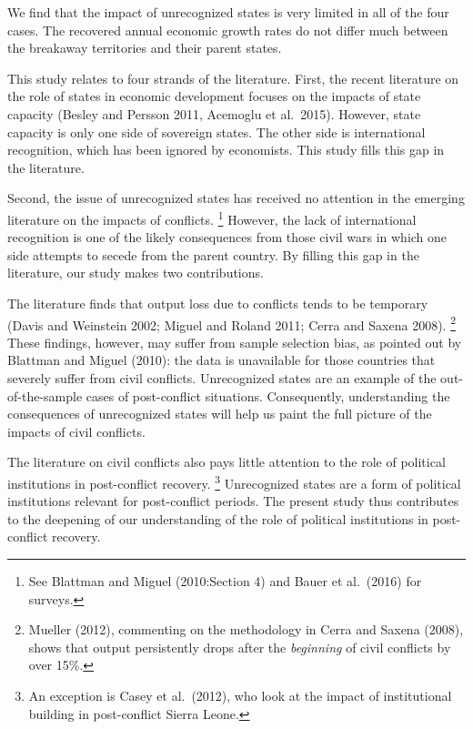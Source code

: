 \documentclass[12pt,a4paper]{article}%
\begin{document}
We find that the impact of unrecognized states is very limited in all of the four cases. 
The recovered annual economic growth rates do not differ much between the breakaway territories and their parent states.

This study relates to four strands of the literature. 
First, the recent literature on the role of states in economic development focuses on the impacts of state capacity (Besley and Persson 2011, Acemoglu et al.\ 2015). 
However, state capacity is only one side of sovereign states. 
The other side is international recognition, which has been ignored by economists. 
This study fills this gap in the literature.

Second, the issue of unrecognized states has received no attention in the emerging literature on the impacts of conflicts.%
\footnote{
	See Blattman and Miguel (2010:Section 4) and Bauer et al.\ (2016) for surveys.
}  
However, the lack of international recognition is one of the likely consequences from those civil wars in which one side attempts to secede from the parent country. 
By filling this gap in the literature, our study makes two contributions. 

The literature finds that output loss due to conflicts tends to be temporary (Davis and Weinstein 2002; Miguel and Roland 2011; Cerra and Saxena 2008).%
\footnote{
	Mueller (2012), commenting on the methodology in Cerra and Saxena (2008), shows that output persistently drops after the \textit{beginning} of civil conflicts by over 15\%.
} 
These findings, however, may suffer from sample selection bias, as pointed out by Blattman and Miguel (2010): the data is unavailable for those countries that severely suffer from civil conflicts.   
Unrecognized states are an example of the out-of-the-sample cases of post-conflict situations. 
Consequently, understanding the consequences of unrecognized states will help us paint the full picture of the impacts of civil conflicts. 

The literature on civil conflicts also pays little attention to the role of political institutions in post-conflict recovery.%
\footnote{
	An exception is Casey et al.\ (2012), who look at the impact of institutional building in post-conflict Sierra Leone.
}
Unrecognized states are a form of political institutions relevant for post-conflict periods. 
The present study thus contributes to the deepening of our understanding of the role of political institutions in post-conflict recovery.
\end{document}
